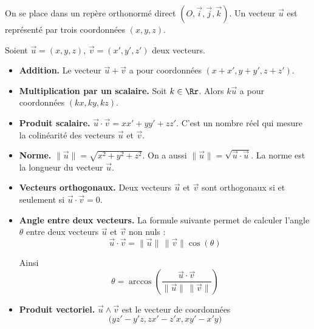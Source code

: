 \documentclass[11pt,class=report,crop=false]{standalone}
\begin{document}

\begin{cours}[Vecteurs]
	


On se place dans un repère orthonormé direct $(O,\vec i,\vec j,\vec k)$. Un vecteur $\vec u$ est représenté par trois coordonnées $(x,y,z)$.


Soient $\vec u = (x,y,z)$, $\vec v = (x',y',z')$ deux vecteurs.
\begin{itemize}
	\item \textbf{Addition.} Le vecteur $\vec u + \vec v$ a pour coordonnées $(x+x',y+y',z+z')$.
	
	\item \textbf{Multiplication par un scalaire.} Soit $k\in\Rr$. Alors $k \vec u$ a pour coordonnées
	$(kx,ky,kz)$.
	
	\item \textbf{Produit scalaire.} $\vec u \cdot \vec v = xx'+yy'+zz'$. C'est un nombre réel qui mesure la colinéarité des vecteurs $\vec u$ et $\vec v$.

	
	\item \textbf{Norme.} $\| \vec u \| = \sqrt{x^2+y^2+z^2}$. On a aussi $\| \vec u \| =\sqrt{\vec u \cdot \vec u}$. La norme est la longueur du vecteur $\vec u$.
	
	\item \textbf{Vecteurs orthogonaux.} Deux vecteurs  $\vec u$ et $\vec v$ sont orthogonaux si et seulement si $\vec u \cdot \vec v = 0$.
	
	\item \textbf{Angle entre deux vecteurs.}
	La formule suivante permet de calculer l'angle $\theta$ entre deux vecteurs $\vec u$ et $\vec v$ non nuls :
	$$\vec u \cdot \vec v = \| \vec u\| \, \|\vec v\| \cos(\theta)$$
	
	Ainsi 
	$$\theta = \arccos\left(\frac{\vec u \cdot \vec v}{ \| \vec u\| \, \|\vec v\|}\right)$$
	
	\smallskip
	
	\item \textbf{Produit vectoriel.} 
	$\vec u \wedge \vec v$ est le vecteur de coordonnées 
	$$\big(yz'-y'z, zx'-z'x, xy'-x'y \big)$$
	

\end{itemize}
\end{cours}
\end{document}
